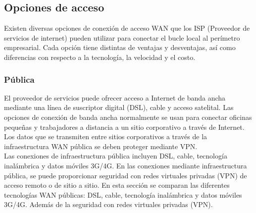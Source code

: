 \documentclass[
	12pt, %
	fleqn, %
	a4paper, %
	oneside, %
]{LegrandOrangeBook}
\begin{document}
\subsection{Opciones de acceso}
Existen diversas opciones de conexión de acceso  WAN que los ISP (Proveedor de servicios de internet) pueden utilizar para conectar el  bucle local al perímetro empresarial. Cada opción tiene distintas de ventajas y  desventajas, así como diferencias con respecto a la  tecnología, la velocidad y el costo.
\subsubsection{Pública}
El proveedor de servicios puede ofrecer acceso a Internet de banda ancha mediante una línea de suscriptor digital (DSL), cable y acceso satelital. Las opciones de conexión de banda ancha normalmente se usan para conectar oficinas pequeñas y trabajadores a distancia a un sitio corporativo a través de Internet. Los datos que se transmiten entre sitios corporativos a través de la infraestructura WAN pública se deben proteger mediante VPN.\\
Las conexiones de infraestructura pública incluyen DSL, cable, tecnología inalámbrica y datos móviles 3G/4G. En las conexiones mediante infraestructura pública, se puede proporcionar seguridad con redes virtuales privadas (VPN) de acceso remoto o de sitio a sitio. En esta sección se comparan las diferentes tecnologías WAN públicas: DSL, cable, tecnología inalámbrica y datos móviles 3G/4G. Además de la seguridad con redes virtuales privadas (VPN).
\end{document}
